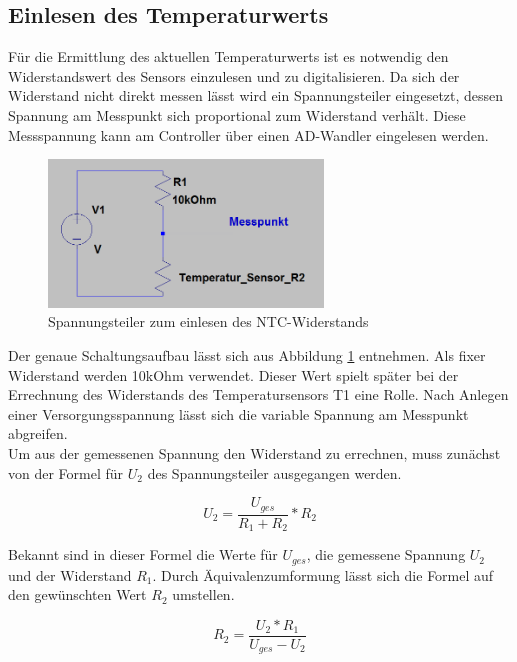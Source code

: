 \subsection{Einlesen des Temperaturwerts}
Für die Ermittlung des aktuellen Temperaturwerts ist es notwendig den Widerstandswert des Sensors einzulesen und zu digitalisieren. Da sich der Widerstand nicht direkt messen lässt wird ein Spannungsteiler eingesetzt, dessen Spannung am Messpunkt sich proportional zum Widerstand verhält. Diese Messspannung kann am Controller über einen AD-Wandler eingelesen werden.

\begin{figure}[h]
\centering
\includegraphics[width=0.65\textwidth]{sensor/temperature_circuit.PNG}
\caption{Spannungsteiler zum einlesen des NTC-Widerstands}
\label{img:temperature_circuit}
\end{figure}

Der genaue Schaltungsaufbau lässt sich aus Abbildung \ref{img:temperature_circuit} entnehmen. Als fixer Widerstand werden 10kOhm verwendet. Dieser Wert spielt später bei der Errechnung des Widerstands des Temperatursensors T1 eine Rolle. Nach Anlegen einer Versorgungsspannung lässt sich die variable Spannung am Messpunkt abgreifen. \\
\label{lbl:temp_equation}
Um aus der gemessenen Spannung den Widerstand zu errechnen, muss zunächst von der Formel für $U_{2}$ des Spannungsteiler ausgegangen werden.

\begin{equation}
U_{2} = \frac{U_{ges}}{R_{1} + R_{2}} * R_{2}
\end{equation}

Bekannt sind in dieser Formel die Werte für $U_{ges}$, die gemessene Spannung $U_{2}$ und der Widerstand $R_{1}$. Durch Äquivalenzumformung lässt sich die Formel auf den gewünschten Wert $R_{2}$ umstellen.

\begin{equation}
R_{2} = \frac{U_{2} * R_{1}}{U_{ges} - U_{2}}
\end{equation}

